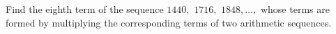 Find the eighth term of the sequence $1440,$ $1716,$ $1848,\ldots,$ whose terms are formed by multiplying the corresponding terms of two arithmetic sequences.